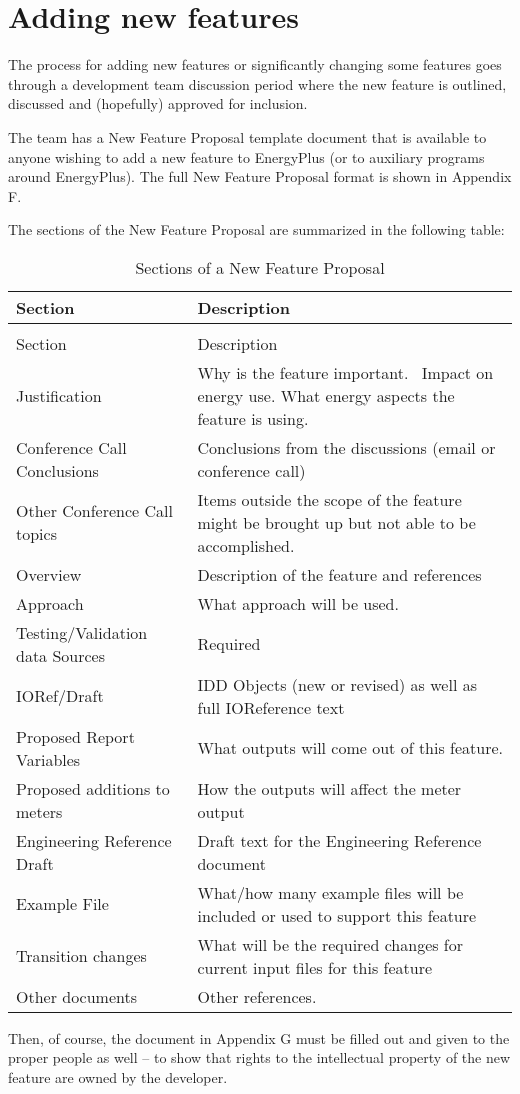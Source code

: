 \section{Adding new features}\label{adding-new-features}

The process for adding new features or significantly changing some features goes through a development team discussion period where the new feature is outlined, discussed and (hopefully) approved for inclusion.

The team has a New Feature Proposal template document that is available to anyone wishing to add a new feature to EnergyPlus (or to auxiliary programs around EnergyPlus). The full New Feature Proposal format is shown in Appendix F.

The sections of the New Feature Proposal are summarized in the following table:

\begin{longtable}[c]{p{1.5in}p{4.5in}}
\caption{Sections of a New Feature Proposal \label{table:sections-of-a-new-feature-proposal}} \tabularnewline
\toprule 
Section & Description \tabularnewline
\midrule
\endfirsthead

\caption[]{Sections of a New Feature Proposal} \tabularnewline
\toprule 
Section & Description \tabularnewline
\midrule
\endhead

Justification & Why is the feature important.~ Impact on energy use. What energy aspects the feature is using. \tabularnewline
Conference Call Conclusions & Conclusions from the discussions (email or conference call) \tabularnewline
Other Conference Call topics & Items outside the scope of the feature might be brought up but not able to be accomplished. \tabularnewline
Overview & Description of the feature and references \tabularnewline
Approach & What approach will be used. \tabularnewline
Testing/Validation data Sources & Required \tabularnewline
IORef/Draft & IDD Objects (new or revised) as well as full IOReference text \tabularnewline
Proposed Report Variables & What outputs will come out of this feature. \tabularnewline
Proposed additions to meters & How the outputs will affect the meter output \tabularnewline
Engineering Reference Draft & Draft text for the Engineering Reference document \tabularnewline
Example File & What/how many example files will be included or used to support this feature \tabularnewline
Transition changes & What will be the required changes for current input files for this feature \tabularnewline
Other documents & Other references. \tabularnewline
\bottomrule
\end{longtable}

Then, of course, the document in Appendix G must be filled out and given to the proper people as well -- to show that rights to the intellectual property of the new feature are owned by the developer.
